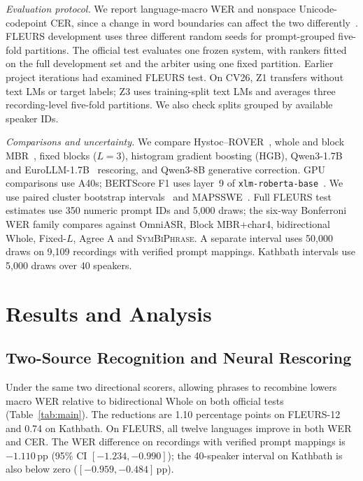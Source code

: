 \documentclass[conference,letterpaper]{IEEEtran}
\newcommand{\pp}{\ensuremath{\,\mathrm{pp}}}
\newcommand{\SymBiPhrase}{\textup{\textsc{SymBiPhrase}}}
\begin{document}
\emph{Evaluation protocol.} We report language-macro WER and nonspace Unicode-codepoint CER, since a change in word boundaries can affect the two differently~\cite{manohar2024normalization,thomas2025cer}. FLEURS development uses three different random seeds for prompt-grouped five-fold partitions. The official test evaluates one frozen system, with rankers fitted on the full development set and the arbiter using one fixed partition. Earlier project iterations had examined FLEURS test. On CV26, Z1 transfers without text LMs or target labels; Z3 uses training-split text LMs and averages three recording-level five-fold partitions. We also check splits grouped by available speaker IDs.

\emph{Comparisons and uncertainty.} We compare Hystoc--ROVER~\cite{fiscus1997rover,benes2024hystoc}, whole and block MBR~\cite{goel2000mbr,xu2011mbr}, fixed blocks ($L=3$), histogram gradient boosting (HGB), Qwen3-1.7B~\cite{yang2025qwen3} and EuroLLM-1.7B~\cite{martins2024eurollm} rescoring, and Qwen3-8B generative correction. GPU comparisons use A40s; BERTScore F1 uses layer~9 of \texttt{xlm-roberta-base}~\cite{zhang2020bertscore,conneau2020xlmr}. We use paired cluster bootstrap intervals~\cite{dror2018significance} and MAPSSWE~\cite{gillick1989mapsswe}. Full FLEURS test estimates use 350 numeric prompt IDs and 5,000 draws; the six-way Bonferroni WER family compares against OmniASR, Block MBR+char4, bidirectional Whole, Fixed-$L$, Agree A and \SymBiPhrase{}. A separate interval uses 50,000 draws on 9,109 recordings with verified prompt mappings. Kathbath intervals use 5,000 draws over 40 speakers.

\section{Results and Analysis}
\subsection{Two-Source Recognition and Neural Rescoring}
Under the same two directional scorers, allowing phrases to recombine lowers macro WER relative to bidirectional Whole on both official tests (Table~\ref{tab:main}). The reductions are 1.10 percentage points on FLEURS-12 and 0.74 on Kathbath. On FLEURS, all twelve languages improve in both WER and CER. The WER difference on recordings with verified prompt mappings is $-1.110\pp$ (95\% CI $[-1.234,-0.990]$); the 40-speaker interval on Kathbath is also below zero ($[-0.959,-0.484]\pp$).
\end{document}
